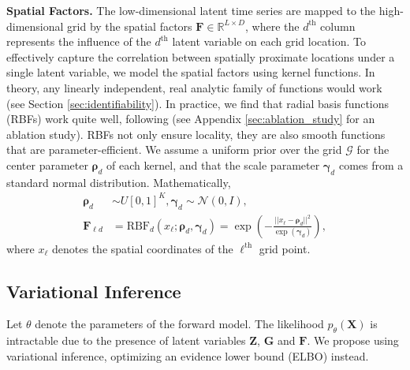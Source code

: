 \textbf{Spatial Factors.} The low-dimensional latent time series are mapped to the high-dimensional grid by the spatial factors $\mathbf{F} \in \mathbb{R}^{L \times D}$, where the $d^\text{th}$ column represents the influence of the $d^\text{th}$ latent variable on each grid location. To effectively capture the correlation between spatially proximate locations under a single latent variable, we model the spatial factors using kernel functions. In theory, any linearly independent, real analytic family of functions would work (see Section \ref{sec:identifiability}). In practice, we find that radial basis functions (RBFs) work quite well, following \citet{manning2014topographic,sennesh2020neuraltopographicfactoranalysisrbf, 2021farnoosh} (see Appendix \ref{sec:ablation_study} for an ablation study). RBFs not only ensure locality, they are also smooth functions that are parameter-efficient. We assume a uniform prior over the grid $\mathcal{G}$ for the center parameter $\boldsymbol{\rho}_d$ of each kernel, and that the scale parameter $\boldsymbol{\gamma}_d$ comes from a standard normal distribution. Mathematically,
\begin{align}
\boldsymbol{\rho}_d &\sim U[0, 1]^K, \boldsymbol{\gamma}_d \sim \mathcal{N}\left(0, I \right), \label{eqn:f_prior} \nonumber \\
\mathbf{F}_{\ell d} &= \text{RBF}_d(x_\ell; \boldsymbol{\rho}_d, \boldsymbol{\gamma}_d) = \exp\left( -\frac{||x_\ell - \boldsymbol{\rho}_d||^2}{\exp(\boldsymbol{\gamma}_d)} \right),
\end{align}
where $x_\ell$ denotes the spatial coordinates of the $\ell^\text{th}$ grid point.




\subsection{Variational Inference}

Let $\theta$ denote the parameters of the forward model. The likelihood $p_\theta \left( \mathbf{X} \right)$ is intractable due to the presence of latent variables $\mathbf{Z}$, $\mathbf{G}$ and $\mathbf{F}$.  We propose using variational inference, optimizing an evidence lower bound (ELBO) instead.

